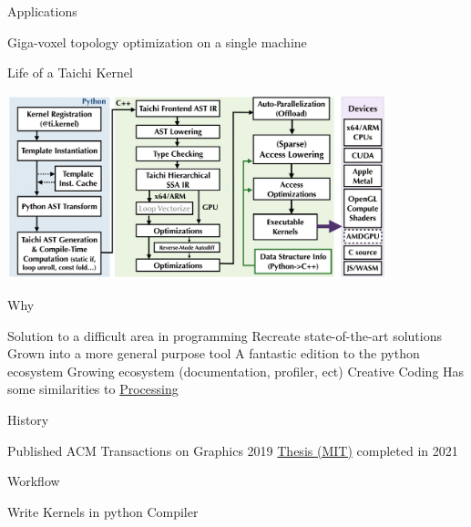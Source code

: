 
\begin{frame}{Applications}
  \begin{outline}
    \1 Giga-voxel topology optimization on a single machine \cite{Liu2018}

  \end{outline}
\end{frame}

\begin{frame}{Life of a Taichi Kernel}
  \begin{centering}
    \includegraphics[width=11cm]{life_of_a_taichi_kernel.png}
  \end{centering}
\end{frame}

\begin{frame}{Why}
  \begin{outline}
    \1 Solution to a difficult area in programming 
      \2 Recreate state-of-the-art solutions 
    \1 Grown into a more general purpose tool
      \2 A fantastic edition to the python ecosystem 
      \2 Growing ecosystem (documentation, profiler, ect)
    \1 Creative Coding
      \2 Has some similarities to \href{https://processing.org}{Processing}
  \end{outline}
\end{frame}

\begin{frame}{History}
  \begin{outline}
    \1 Published ACM Transactions on Graphics 2019 \cite{Hu2019}
    \1 \href{https://yuanming.taichi.graphics/publication/2021-taichi-thesis/}{Thesis (MIT)} 
    completed in 2021
  \end{outline}
\end{frame}

\begin{frame}{Workflow}
  \begin{outline}
    \1 Write Kernels in python
    \2 Compiler 
  \end{outline}
\end{frame}

